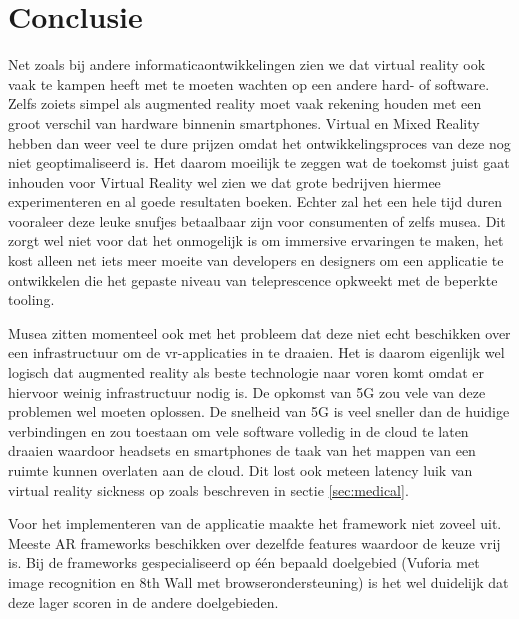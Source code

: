
\chapter{Conclusie}
\label{ch:conclusie}


Net zoals bij andere informaticaontwikkelingen zien we dat virtual reality ook vaak te kampen heeft met te moeten wachten op een andere hard- of software. Zelfs zoiets simpel als augmented reality moet vaak rekening houden met een groot verschil van hardware binnenin smartphones. Virtual en Mixed Reality hebben dan weer veel te dure prijzen omdat het ontwikkelingsproces van deze nog niet geoptimaliseerd is. Het daarom moeilijk te zeggen wat de toekomst juist gaat inhouden voor Virtual Reality wel zien we dat grote bedrijven hiermee experimenteren en al goede resultaten boeken. Echter zal het een hele tijd duren vooraleer deze leuke snufjes betaalbaar zijn voor consumenten of zelfs musea. Dit zorgt wel niet voor dat het onmogelijk is om immersive ervaringen te maken, het kost alleen net iets meer moeite van developers en designers om een applicatie te ontwikkelen die het gepaste niveau van teleprescence opkweekt met de beperkte tooling.

Musea zitten momenteel ook met het probleem dat deze niet echt beschikken over een infrastructuur om de vr-applicaties in te draaien. Het is daarom eigenlijk wel logisch dat augmented reality als beste technologie naar voren komt omdat er hiervoor weinig infrastructuur nodig is. De opkomst van 5G zou vele van deze problemen wel moeten oplossen. De snelheid van 5G is veel sneller dan de huidige verbindingen en zou toestaan om vele software volledig in de cloud te laten draaien waardoor headsets en smartphones de taak van het mappen van een ruimte kunnen overlaten aan de cloud. Dit lost ook meteen latency luik van virtual reality sickness op zoals beschreven in sectie \ref{sec:medical}\autocite{Bastug2017}.

Voor het implementeren van de applicatie maakte het framework niet zoveel uit. Meeste AR frameworks beschikken over dezelfde features waardoor de keuze vrij is. Bij de frameworks gespecialiseerd op één bepaald doelgebied (Vuforia met image recognition en 8th Wall met browserondersteuning) is het wel duidelijk dat deze lager scoren in de andere doelgebieden.